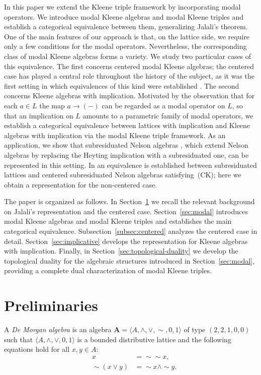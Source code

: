 \documentclass{article}
\newcommand{\A}{\mathbf{A}}
\begin{document}
In this paper we extend the Kleene triple framework by incorporating modal
operators. We introduce modal Kleene algebras and modal Kleene triples and
establish a categorical equivalence between them, generalizing Jalali's
theorem. One of the main features of our approach is that, on the lattice side, we require only a few conditions for the modal operators. Nevertheless, the corresponding class of modal Kleene algebras forms a variety. We study two particular cases of this equivalence. The first
concerns centered modal Kleene algebras; the centered case has played a
central role throughout the history of the subject, as it was the first
setting in which equivalences of this kind were established
\cite{cignoli1986class, jalali}. The second concerns
Kleene algebras with implication. Motivated by the observation that
for each $a \in L$ the map $a \to (-)$ can be regarded as a modal operator
on $L$, so that an implication on $L$ amounts to a parametric family of
modal operators, we establish a categorical
equivalence between lattices with implication and Kleene algebras with
implication via the modal Kleene triple framework. As an application, we
show that subresiduated Nelson algebras \cite{noemi2025}, which extend
Nelson algebras by replacing the Heyting implication with a subresiduated
one, can be represented in this setting. In \cite{noemi2025} an equivalence
is established between subresiduated lattices and centered subresiduated
Nelson algebras satisfying~(CK); here we obtain a representation for the
non-centered case.

The paper is organized as follows. In Section~\ref{preliminaries} we recall the relevant
background on Jalali's representation and the centered case. Section~\ref{sec:modal}
introduces modal Kleene algebras and modal Kleene triples and establishes
the main categorical equivalence. Subsection~\ref{subsec:centered} analyzes the centered case
in detail. Section~\ref{sec:implicative} develops the representation for Kleene algebras
with implication. Finally, in Section~\ref{sec:topological-duality} we develop the topological duality for
the algebraic structures introduced in Section~\ref{sec:modal}, providing a complete dual
characterization of modal Kleene triples.

\section{Preliminaries}\label{preliminaries}

A \emph{De Morgan algebra} is an algebra $\A=\langle A,\wedge,\vee,\sim,0,1\rangle$ of type $(2,2,1,0,0)$ such that $\langle A,\wedge,\vee,0,1\rangle$ is a bounded distributive lattice and the following equations hold for all $x,y\in A$:
\begin{align}
\quad x &= \sim \sim x, \tag{Inv}\label{Inv}\\
\quad \sim (x \vee y) &= \sim x \wedge \sim y. \tag{DM}\label{DM}
\end{align}
\end{document}
